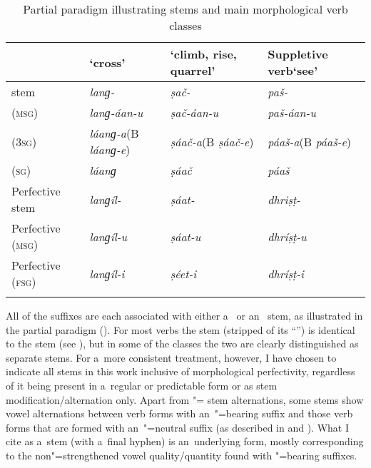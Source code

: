 \begin{table}[b]
\caption{Partial paradigm illustrating stems and main morphological verb classes}

\begin{tabularx}{\textwidth}{ l P{20mm} P{37mm} P{27mm} }
\lsptoprule
& \newline `cross' &
\newline `climb, rise, quarrel' &
Suppletive verb\newline `see'\\\midrule
{} stem &
\textit{lanɡ-} &
\textit{ṣač-} &
\textit{paš-} \\
 (\textsc{msg}) &
\textit{lanɡ-áan-u} &
\textit{ṣač-áan-u} &
\textit{paš-áan-u} \\
 (\textsc{3sg}) &
\textit{láanɡ-a}\newline (B \textit{láanɡ-e}) &
\textit{ṣáač-a}\newline (B \textit{ṣáač-e}) &
\textit{páaš-a}\newline (B \textit{páaš-e}) \\
 (\textsc{sg}) &
\textit{láanɡ} &
\textit{ṣáač} &
\textit{páaš} \\
Perfective stem &
\textit{lanɡíl-} &
\textit{ṣáat-} &
\textit{dhriṣṭ-} \\
Perfective (\textsc{msg}) &
\textit{lanɡíl-u} &
\textit{ṣáat-u} &
\textit{dhríṣṭ-u} \\
Perfective (\textsc{fsg}) &
\textit{lanɡíl-i} &
\textit{ṣéet-i} &
\textit{dhríṣṭ-i} \\\lspbottomrule
\end{tabularx}
\label{tab:8-3}
\end{table}


All of the  suffixes are each associated with either a~ or an~
stem, as illustrated in the partial paradigm (). For most verbs the  stem
(stripped of its  ``'') is identical to the  stem (see ), but
in some of the classes the two are clearly distinguished as separate stems. For a~more consistent
treatment, however, I have chosen to indicate all  stems in this work inclusive of
morphological perfectivity, regardless of it being present in a~regular or predictable form or as
stem modification/alternation only. Apart from "= stem alternations, some
 stems show vowel alternations between  verb forms with an~"=bearing
suffix and those  verb forms that are formed with an~"=neutral suffix (as described
in  and ). What I cite as a~stem (with a~final hyphen) is an~underlying form, mostly
corresponding to the non"=strengthened vowel quality/quantity found with "=bearing suffixes.


